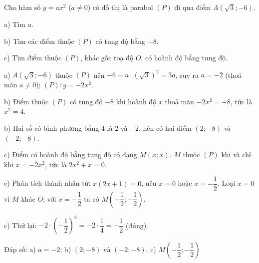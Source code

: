\begin{problem}[9DS-HSB2-034]
Cho hàm số $y = ax^2$ ($a \neq 0$) có đồ thị là parabol $(P)$ đi qua điểm $A\left(\sqrt{3}; -6\right)$.

a) Tìm $a$.

b) Tìm các điểm thuộc $(P)$ có tung độ bằng $-8$.

c) Tìm điểm thuộc $(P)$, khác gốc toạ độ $O$, có hoành độ bằng tung độ.

\begin{solution}
a) $A\left(\sqrt{3}; -6\right)$ thuộc $(P)$ nên $-6 = a \cdot \left(\sqrt{3}\right)^2 = 3a$, suy ra $a = -2$ (thoả mãn $a \neq 0$); $(P)\colon y = -2x^2$.

b) Điểm thuộc $(P)$ có tung độ $-8$ khi hoành độ $x$ thoả mãn $-2x^2 = -8$, tức là $x^2 = 4$.

b) Hai số có bình phương bằng $4$ là $2$ và $-2$, nên có hai điểm $(2; -8)$ và $(-2; -8)$.

c) Điểm có hoành độ bằng tung độ có dạng $M(x; x)$. $M$ thuộc $(P)$ khi và chỉ khi $x = -2x^2$, tức là $2x^2 + x = 0$.

c) Phân tích thành nhân tử: $x(2x + 1) = 0$, nên $x = 0$ hoặc $x = -\dfrac{1}{2}$. Loại $x = 0$ vì $M$ khác $O$; với $x = -\dfrac{1}{2}$ ta có $M\left(-\dfrac{1}{2}; -\dfrac{1}{2}\right)$.

c) Thử lại: $-2 \cdot \left(-\dfrac{1}{2}\right)^2 = -2 \cdot \dfrac{1}{4} = -\dfrac{1}{2}$ (đúng).

Đáp số: a) $\boxed{a = -2}$; b) $\boxed{(2; -8) \text{ và } (-2; -8)}$; c) $\boxed{M\left(-\dfrac{1}{2}; -\dfrac{1}{2}\right)}$
\end{solution}
\end{problem}

